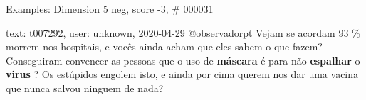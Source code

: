 \begin{frame}{Examples: Dimension 5 neg, score -3, \# 000031}
\footnotesize
\begin{alertblock}{text: t007292, user: unknown, 2020-04-29}
@observadorpt Vejam se acordam 93 \% morrem nos hospitais, e vocês ainda acham 
que eles sabem o que fazem? Conseguiram convencer as pessoas que o uso de 
\textbf{máscara} é para não \textbf{espalhar} o \textbf{virus} ? Os estúpidos 
engolem isto, e ainda por cima querem nos dar uma vacina que nunca salvou 
ninguem de nada? 
\end{alertblock}
\end{frame}
